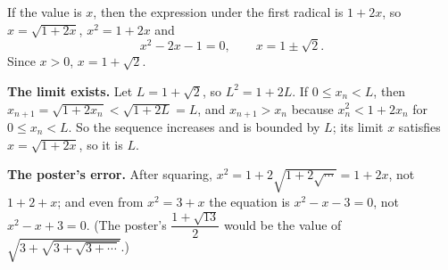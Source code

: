 If the value is $x$, then the expression under the first radical is $1+2x$, so $x=\sqrt{1+2x}$, $x^2=1+2x$ and
\[
x^2-2x-1=0,\qquad x=1\pm\sqrt2 .
\]
Since $x>0$, $x=\boxed{1+\sqrt2}$.

\textbf{The limit exists.} Let $L=1+\sqrt2$, so $L^2=1+2L$. If $0\le x_n<L$, then $x_{n+1}=\sqrt{1+2x_n}<\sqrt{1+2L}=L$, and $x_{n+1}>x_n$ because $x_n^2<1+2x_n$ for $0\le x_n<L$. So the sequence increases and is bounded by $L$; its limit $x$ satisfies $x=\sqrt{1+2x}$, so it is $L$.

\textbf{The poster's error.} After squaring, $x^2=1+2\sqrt{1+2\sqrt{\cdots}}=1+2x$, not $1+2+x$; and even from $x^2=3+x$ the equation is $x^2-x-3=0$, not $x^2-x+3=0$. (The poster's $\dfrac{1+\sqrt{13}}{2}$ would be the value of $\sqrt{3+\sqrt{3+\sqrt{3+\cdots}}}$.)
